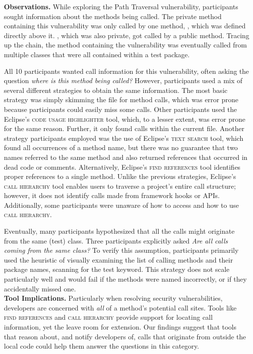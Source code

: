 \documentclass[conference]{IEEEtran}
\begin{document}
\noindent\textbf{Observations.}
While exploring the Path Traversal vulnerability, participants sought information about the methods being called. 
The private method containing this vulnerability was only called by one method, , which was defined directly above it. , which was also private, got called by a public method. Tracing up the chain, the method containing the vulnerability was eventually called from multiple classes that were all contained within a test package.

All 10 participants wanted call information for this vulnerability, often asking the question \textit{where is this method being called?} 
However, participants used a mix of several different strategies to obtain the same information.
The most basic strategy was simply skimming the file for method calls, which was error prone because participants could easily miss some calls.
Other participants used the Eclipse's \textsc{code usage highlighter} tool, which, to a lesser extent, was error prone for the same reason. Further, it only found calls within the current file.
Another strategy participants employed was the use of Eclipse's \textsc{text search} tool, which found all occurrences of a method name, but there was no guarantee that two names referred to the same method and also returned references that occurred in dead code or comments.
Alternatively, Eclipse's \textsc{find references} tool identifies proper references to a single method.
Unlike the previous strategies, Eclipse's \textsc{call hierarchy} tool enables users to traverse a project's entire call structure; however, it does not identify calls made from framework hooks or APIs.
Additionally, some participants were unaware of how to access and how to use \textsc{call hierarchy}.

Eventually, many participants hypothesized that all the calls might originate from the same (test) class. Three participants explicitly asked \textit{Are all calls coming from the same class?} To verify this assumption, participants primarily used the heuristic of visually examining the list of calling methods and their package names, scanning for the test keyword. This strategy does not scale particularly well and would fail if the methods were named incorrectly, or if they accidentally missed one.
\\

\noindent\textbf{Tool Implications.}
Particularly when resolving security vulnerabilities, developers are concerned with \textit{all} of a method's potential call sites.
Tools like \textsc{find references} and \textsc{call hierarchy} provide support for locating call information, yet the leave room for extension.
Our findings suggest that tools that reason about, and notify developers of, calls that originate from outside the local code could help them answer the questions in this category.
\end{document}
